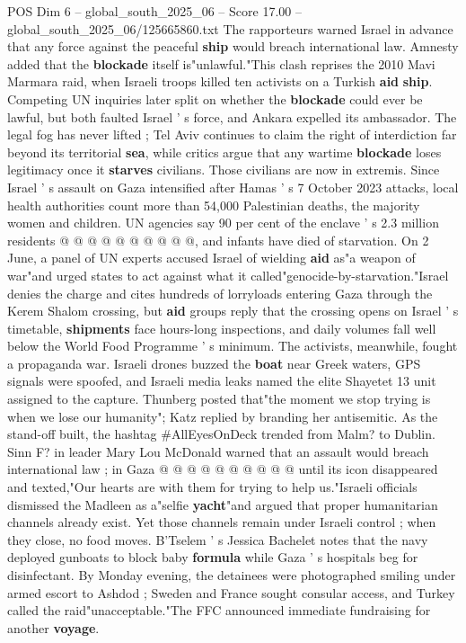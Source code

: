 \begin{textsample}{POS Dim 6 – global\_south\_2025\_06 – Score 17.00 – global\_south\_2025\_06/125665860.txt}
The rapporteurs warned Israel in advance that any force against the peaceful \textbf{ship} would breach international law.
Amnesty added that the \textbf{blockade} itself is"unlawful."This clash reprises the 2010 Mavi Marmara raid, when Israeli troops killed ten activists on a Turkish \textbf{aid} \textbf{ship}.
Competing UN inquiries later split on whether the \textbf{blockade} could ever be lawful, but both faulted Israel ' s force, and Ankara expelled its ambassador.
The legal fog has never lifted ; Tel Aviv continues to claim the right of interdiction far beyond its territorial \textbf{sea}, while critics argue that any wartime \textbf{blockade} loses legitimacy once it \textbf{starves} civilians.
Those civilians are now in extremis.
Since Israel ' s assault on Gaza intensified after Hamas ' s 7 October 2023 attacks, local health authorities count more than 54,000 Palestinian deaths, the majority women and children.
UN agencies say 90 per cent of the enclave ' s 2.3 million residents @ @ @ @ @ @ @ @ @ @, and infants have died of starvation.
On 2 June, a panel of UN experts accused Israel of wielding \textbf{aid} as"a weapon of war"and urged states to act against what it called"genocide-by-starvation."Israel denies the charge and cites hundreds of lorryloads entering Gaza through the Kerem Shalom crossing, but \textbf{aid} groups reply that the crossing opens on Israel ' s timetable, \textbf{shipments} face hours-long inspections, and daily volumes fall well below the World Food Programme ' s minimum.
The activists, meanwhile, fought a propaganda war.
Israeli drones buzzed the \textbf{boat} near Greek waters, GPS signals were spoofed, and Israeli media leaks named the elite Shayetet 13 unit assigned to the capture.
Thunberg posted that"the moment we stop trying is when we lose our humanity"; Katz replied by branding her antisemitic.
As the stand-off built, the hashtag \#AllEyesOnDeck trended from Malm? to Dublin.
Sinn F? in leader Mary Lou McDonald warned that an assault would breach international law ; in Gaza @ @ @ @ @ @ @ @ @ @ until its icon disappeared and texted,"Our hearts are with them for trying to help us."Israeli officials dismissed the Madleen as a"selfie \textbf{yacht}"and argued that proper humanitarian channels already exist.
Yet those channels remain under Israeli control ; when they close, no food moves.
B'Tselem ' s Jessica Bachelet notes that the navy deployed gunboats to block baby \textbf{formula} while Gaza ' s hospitals beg for disinfectant.
By Monday evening, the detainees were photographed smiling under armed escort to Ashdod ; Sweden and France sought consular access, and Turkey called the raid"unacceptable."The FFC announced immediate fundraising for another \textbf{voyage}.

\end{textsample}
